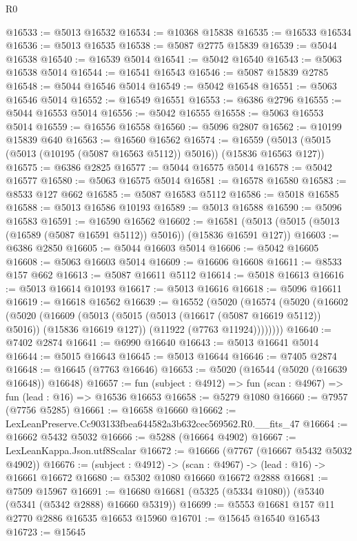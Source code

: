 \begin{lexlean}{R0}
\begin{coremodule}
@16533 := @5013 @16532
@16534 := @10368 @15838
@16535 := @16533 @16534
@16536 := @5013 @16535
@16538 := @5087 @2775 @15839
@16539 := @5044 @16538
@16540 := @16539 @5014
@16541 := @5042 @16540
@16543 := @5063 @16538 @5014
@16544 := @16541 @16543
@16546 := @5087 @15839 @2785
@16548 := @5044 @16546 @5014
@16549 := @5042 @16548
@16551 := @5063 @16546 @5014
@16552 := @16549 @16551
@16553 := @6386 @2796
@16555 := @5044 @16553 @5014
@16556 := @5042 @16555
@16558 := @5063 @16553 @5014
@16559 := @16556 @16558
@16560 := @5096 @2807
@16562 := @10199 @15839 @640
@16563 := @16560 @16562
@16574 := @16559 (@5013 (@5015 (@5013 (@10195 (@5087 @16563 @5112)) @5016)) (@15836 @16563 @127))
@16575 := @6386 @2825
@16577 := @5044 @16575 @5014
@16578 := @5042 @16577
@16580 := @5063 @16575 @5014
@16581 := @16578 @16580
@16583 := @8533 @127 @662
@16585 := @5087 @16583 @5112
@16586 := @5018 @16585
@16588 := @5013 @16586 @10193
@16589 := @5013 @16588
@16590 := @5096 @16583
@16591 := @16590 @16562
@16602 := @16581 (@5013 (@5015 (@5013 (@16589 (@5087 @16591 @5112)) @5016)) (@15836 @16591 @127))
@16603 := @6386 @2850
@16605 := @5044 @16603 @5014
@16606 := @5042 @16605
@16608 := @5063 @16603 @5014
@16609 := @16606 @16608
@16611 := @8533 @157 @662
@16613 := @5087 @16611 @5112
@16614 := @5018 @16613
@16616 := @5013 @16614 @10193
@16617 := @5013 @16616
@16618 := @5096 @16611
@16619 := @16618 @16562
@16639 := @16552
    (@5020
      (@16574
        (@5020
          (@16602
            (@5020
              (@16609
                (@5013 (@5015 (@5013 (@16617 (@5087 @16619 @5112)) @5016)) (@15836 @16619 @127))
                (@11922 (@7763 @11924))))))))
@16640 := @7402 @2874
@16641 := @6990 @16640
@16643 := @5013 @16641 @5014
@16644 := @5015 @16643
@16645 := @5013 @16644
@16646 := @7405 @2874
@16648 := @16645 (@7763 @16646)
@16653 := @5020 (@16544 (@5020 (@16639 @16648)) @16648)
@16657 := fun (subject : @4912) => fun (scan : @4967) => fun (lead : @16) => @16536 @16653
@16658 := @5279 @1080
@16660 := @7957 (@7756 @5285)
@16661 := @16658 @16660
@16662 := LexLeanPreserve.Cc903133fbea644582a3b632cec569562.R0.__fits_47
@16664 := @16662 @5432 @5032
@16666 := @5288 (@16664 @4902)
@16667 := LexLeanKappa.Json.utf8Scalar
@16672 := @16666 (@7767 (@16667 @5432 @5032 @4902))
@16676 := (subject : @4912) -> (scan : @4967) -> (lead : @16) -> @16661 @16672
@16680 := @5302 @1080 @16660 @16672 @2888
@16681 := @7509 @15967
@16691 := @16680 @16681 (@5325 (@5334 @1080)) (@5340 (@5341 (@5342 @2888) @16660 @5319))
@16699 := @5553 @16681 @157 @11 @2770 @2886 @16535 @16653 @15960
@16701 := @15645 @16540 @16543
@16723 := @15645

\end{coremodule}
\end{lexlean}

